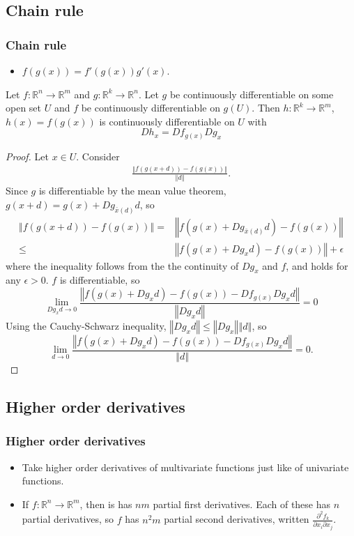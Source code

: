 \documentclass[compress]{beamer}
\def\R{\mathbb{R}}
\newcommand{\norm}[1]{\left\Vert {#1} \right\Vert}
\renewcommand{\to}{{\rightarrow}}
\begin{document}
\subsection{Chain rule}

\begin{frame}\frametitle{Chain rule}
  \begin{itemize}
  \item $f(g(x)) = f'(g(x)) g'(x)$. 
  \end{itemize}
  \begin{theorem} \label{thm:chain}
    Let $f:\R^n \to \R^m$ and $g: \R^k \to \R^n$. Let $g$ be
    continuously differentiable on some open set $U$ and $f$ be
    continuously differentiable on $g(U)$. Then $h:\R^k \to \R^m$, $h
    (x) = f(g(x))$ is continuously differentiable on $U$ with 
    \[ Dh_x = D f_{g(x)} D g_x \]
  \end{theorem}
\end{frame}

\begin{frame}[shrink]
  \begin{proof}
    Let $x \in U$. Consider
    \begin{align*}
      \frac{\norm{ f(g(x+d)) - f(g(x))}} {\norm{d}}.
    \end{align*}
    Since $g$ is differentiable by the mean value theorem, $g(x+d) =
    g(x) + Dg_{\bar{x}(d)} d$, so
    \begin{align*}
      \norm{ f(g(x+d)) - f(g(x))} = &  
      \norm{ f(g(x) + D g_{\bar{x}(d)} d ) - f(g(x))} \\
      \leq & \norm{f(g(x) + D g_x d) - f(g(x))} + \epsilon
    \end{align*}
    where the inequality follows from the the continuity of $D g_x$ and
    $f$, and holds for any $\epsilon >0$. $f$ is differentiable, so
    \[ \lim_{D g_x d \to 0} \frac{\norm{f(g(x) + D g_x d) -
        f(g(x)) - D f_{g(x)} D g_x d}} {\norm{D g_x d}} = 0 \]
    Using the Cauchy-Schwarz inequality, $\norm{D g_x d} \leq \norm{D
      g_x} \norm{d}$, so
    \[ \lim_{ d \to 0} \frac{\norm{f(g(x) + D g_x d) -
        f(g(x)) - D f_{g(x)} D g_x d}} {\norm{d}} = 0. \]   
  \end{proof}
\end{frame}

\subsection{Higher order derivatives}
\begin{frame}\frametitle{Higher order derivatives}
  \begin{itemize}
  \item Take higher order derivatives of multivariate functions just
    like of univariate functions. 
  \item If $f: \R^n \to \R^m$, then is has $nm$
    partial first derivatives. Each of these has $n$ partial derivatives,
    so $f$ has $n^2m$ partial second derivatives, written
    $\frac{\partial^2 f_k}{\partial x_i \partial x_j}$. 
  \end{itemize}
\end{frame}
\end{document}
